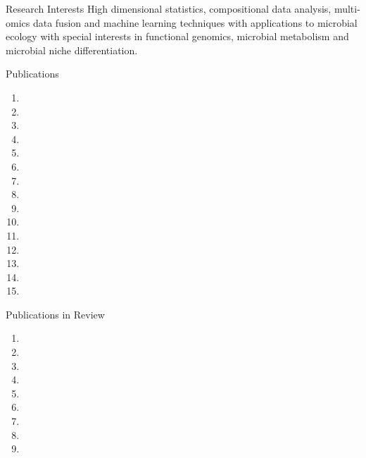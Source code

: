 \documentclass{resume} %
\begin{document}
\begin{rSection}{Research Interests}
  High dimensional statistics, compositional data analysis, multi-omics data fusion and machine learning techniques with applications to microbial ecology with special interests in functional genomics, microbial metabolism and microbial niche differentiation.
\end{rSection}
\begin{rSection}{Publications}
  \begin{enumerate}
    \item {}
    \item {}
    \item {}
    \item {}
    \item {}
    \item {}
    \item {}
    \item {}
    \item {}
    \item {}
    \item {}
    \item {}
    \item {}
    \item {}
    \item {}
  \end{enumerate}
\end{rSection}

\begin{rSection}{Publications in Review}
  \begin{enumerate}
    \item {}
    \item {}
    \item {}
    \item {}
    \item {}
    \item {}
    \item {}
    \item {}
    \item {}
  \end{enumerate}
\end{rSection}
\end{document}
